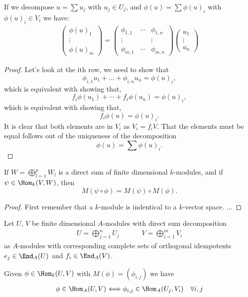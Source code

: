 \begin{prop}
If we decompose \(u=\sum u_{j}\) with \(u_{j}\in U_{j}\), and \(\phi (u)=\sum \phi (u)_{i}\) with \(\phi (u)_{i}\in V_{i}\) we have:
\begin{align*}
\begin{pmatrix}\phi (u)_{1} \\ \vdots  \\ \phi (u)_{m}\end{pmatrix} =
\begin{pmatrix}\phi _{1,1} & \cdots  & \phi _{1,n}\\
\vdots  & & \vdots  \\
\phi _{m,1} & \cdots  & \phi _{m,n}\end{pmatrix}
\begin{pmatrix}u_{1} \\ \vdots  \\ u_{n}\end{pmatrix}
\end{align*}
\end{prop}

\begin{proof}
Let's look at the ith row, we need to show that
\[
\phi _{i,1}u_{1}+\ldots +\phi _{i,n}u_{n}=\phi (u)_{i},
\]
which is equivalent with showing that,
\[
f_{i}\phi (u_{1})+\cdots +f_{i}\phi (u_{n})=\phi (u)_{i},
\]
which is equivalent with showing that,
\[
f_{i}\phi (u)=\phi (u)_{i}.
\]
It is clear that both elements are in \(V_{i}\) as \(V_{i}=f_{i}V\). That the elements must be equal follows out of the uniqueness of the decomposition
\[
\phi (u)=\sum \phi (u)_{i}.
\]
\end{proof}

\begin{prop}
If \(W=\bigoplus_{l=1}^p W_{l}\) is a direct sum of finite dimensional \(k\)-modules, and if \(\psi \in \Hom_{k}(V,W)\), then
\[
M(\psi \circ \phi )=M(\psi )\circ M(\phi ).
\]
\end{prop}

\begin{proof}
First remember that a \(k\)-module is indentical to a \(k\)-vector space. ... 
\end{proof}


\begin{prop}
Let \(U\), \(V\) be finite dimensional \(A\)-modules with direct sum decomposition
\begin{align*}
U=\bigoplus_{j=1}^nU_{j} && && V=\bigoplus_{i=1}^mV_{i}
\end{align*}
as \(A\)-modules with corresponding complete sets of orthogonal idempotents \(e_{j}\in \End_A(U)\) and \(f_{i}\in \End_A(V)\).

Given \(\phi \in \Hom_{k}(U,V)\) with \(M(\phi )=(\phi _{i,j})\) we have
\begin{align*}
\phi \in \Hom_A(U,V) \Longleftrightarrow  \phi _{i,j}\in \Hom_A(U_{j},V_{i}) &&\forall i,j
\end{align*}
\end{prop}

